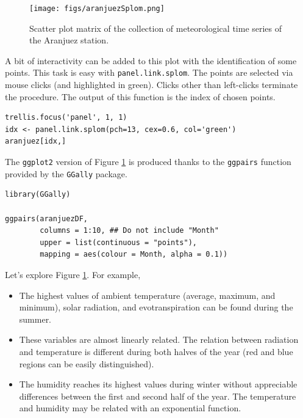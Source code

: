 \begin{figure}[htbp]
\centering
\texttt{[image: figs/aranjuezSplom.png]}
\caption{Scatter plot matrix of the collection of meteorological time series of the Aranjuez station. \label{fig:aranjuezSplom}}
\end{figure}

A bit of interactivity can be added to this plot with the
identification of some points. This task is easy with
\texttt{panel.link.splom}. The points are selected via mouse clicks (and
highlighted in green). Clicks other than left-clicks terminate the
procedure. The output of this function is the index of chosen
points.


\lstset{language=r,label= ,caption= ,captionpos=b,numbers=none}
\begin{lstlisting}
trellis.focus('panel', 1, 1)
idx <- panel.link.splom(pch=13, cex=0.6, col='green')
aranjuez[idx,]
\end{lstlisting}

The \texttt{ggplot2} version of Figure \ref{fig:aranjuezSplom} is produced
thanks to the \texttt{ggpairs} function provided by the \texttt{GGally} package.


\lstset{language=r,label= ,caption= ,captionpos=b,numbers=none}
\begin{lstlisting}
library(GGally)

ggpairs(aranjuezDF,
        columns = 1:10, ## Do not include "Month"
        upper = list(continuous = "points"),
        mapping = aes(colour = Month, alpha = 0.1))
\end{lstlisting}

Let's explore Figure \ref{fig:aranjuezSplom}. For example,
\begin{itemize}
\item The highest values of ambient temperature (average, maximum, and
minimum), solar radiation, and evotranspiration can be found during
the summer.
\item These variables are almost linearly related. The relation between
radiation and temperature is different during both halves of the
year (red and blue regions can be easily distinguished).
\item The humidity reaches its highest values during winter without
appreciable differences between the first and second half of the
year. The temperature and humidity may be related with an
exponential function.
\end{itemize}

